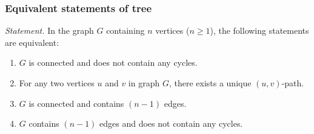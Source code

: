 \documentclass[a4paper,12pt]{report}
\begin{document}
\subsubsection{Equivalent statements of tree}
\textit{Statement. }In the graph $G$ containing $n$ vertices ($n ≥ 1$), the following statements are equivalent:
\begin{enumerate}[label=(\arabic*)]
\item $G$ is connected and does not contain any cycles.
\item For any two vertices $u$ and $v$ in graph $G$, there exists a unique $(u, v)$-path.
\item $G$ is connected and contains $(n - 1)$ edges.
\item $G$ contains $(n - 1)$ edges and does not contain any cycles.
\end{enumerate}
\end{document}
